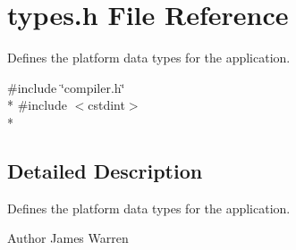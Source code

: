 \section{types.\-h File Reference}
\label{types_8h}


Defines the platform data types for the application.  


{\ttfamily \#include \char`\"{}compiler.\-h\char`\"{}}\\*
{\ttfamily \#include $<$cstdint$>$}\\*


\subsection{Detailed Description}
Defines the platform data types for the application. \begin{DoxyAuthor}{Author}
James Warren 
\end{DoxyAuthor}
